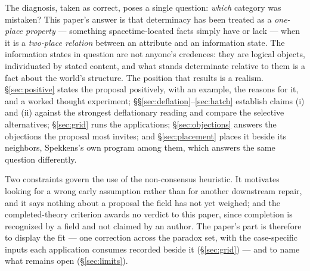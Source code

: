 The diagnosis, taken as correct, poses a single question: \emph{which} category was mistaken? This paper's answer is that determinacy has been treated as a \emph{one-place property} --- something spacetime-located facts simply have or lack --- when it is a \emph{two-place relation} between an attribute and an information state. The information states in question are not anyone's credences: they are logical objects, individuated by stated content, and what stands determinate relative to them is a fact about the world's structure. The position that results is a realism. \S\ref{sec:positive} states the proposal positively, with an example, the reasons for it, and a worked thought experiment; \S\S\ref{sec:deflation}--\ref{sec:hatch} establish claims (i) and (ii) against the strongest deflationary reading and compare the selective alternatives; \S\ref{sec:grid} runs the applications; \S\ref{sec:objections} answers the objections the proposal most invites; and \S\ref{sec:placement} places it beside its neighbors, Spekkens's own program among them, which answers the same question differently.

Two constraints govern the use of the non-consensus heuristic. It motivates looking for a wrong early assumption rather than for another downstream repair, and it says nothing about a proposal the field has not yet weighed; and the completed-theory criterion awards no verdict to this paper, since completion is recognized by a field and not claimed by an author. The paper's part is therefore to display the fit --- one correction across the paradox set, with the case-specific inputs each application consumes recorded beside it (\S\ref{sec:grid}) --- and to name what remains open (\S\ref{sec:limits}).

